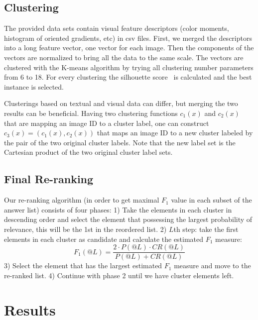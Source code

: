 \documentclass{acm_proc_article-me}
\begin{document}
\subsection{Clustering}
\label{sec:clust}

The provided data sets contain visual feature descriptors (color moments, histogram of oriented gradients, etc) in csv files. First, we merged the descriptors into a long feature vector, one vector for each image. Then the components of the vectors are normalized to bring all the data to the same scale. The vectors are clustered with the K-means algorithm by trying all clustering number parameters from 6 to 18. For every clustering the silhouette score~\cite{rousseeuw1987silhouettes} is calculated and the best instance is selected.

Clusterings based on textual and visual data can differ, but merging the two results can be beneficial. Having two clustering functions $c_1(x)$ and $c_2(x)$ that are mapping an image ID to a cluster label, one can construct $c_3(x) = (c_1(x), c_2(x))$ that maps an image ID to a new cluster labeled by the pair of the two original cluster labels. Note that the new label set is the Cartesian product of the two original cluster label sets.

\subsection{Final Re-ranking}

Our re-ranking algorithm (in order to get maximal $F_1$ value in each subset of the answer list) consists of four phases:
1) Take the elements in each cluster in descending order and select the element that possessing the largest probability of relevance, this will be the 1st in the reordered list.
2) $L$th step: take the first elements in each cluster as candidate and calculate the estimated $F_1$ measure: \begin{equation} F_1(@L) = \frac{2 \cdot P(@L) \cdot CR(@L)}{P(@L) + CR(@L)} \end{equation}
3) Select the element that has the largest estimated $F_1$ measure and move to the re-ranked list.
4) Continue with phase 2 until we have cluster elements left.

\section{Results}
\end{document}
